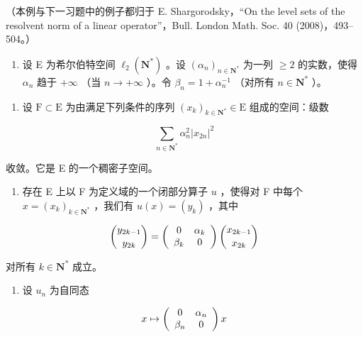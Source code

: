 （本例与下一习题中的例子都归于 E. Shargorodsky，“On the level sets of the resolvent norm of a linear operator”，Bull. London Math. Soc. 40 (2008)，493–504。）

\begin{enumerate}
\def\labelenumi{\arabic{enumi})}
\setcounter{enumi}{18}
\tightlist
\item
  设 E 为希尔伯特空间 \(\ell_2(\mathbf{N}^*)\) 。设 \((\alpha_n)_{n \in \mathbf{N}^*}\) 为一列 \(\geqslant 2\) 的实数，使得 \(\alpha_n\) 趋于 \(+\infty\) （当 \(n \to +\infty\) ）。令 \(\beta_n = 1 + \alpha_n^{-1}\) （对所有 \(n \in \mathbf{N}^*\) ）。
\end{enumerate}

\begin{enumerate}
\def\labelenumi{\alph{enumi})}
\tightlist
\item
  设 \(\mathrm{F}\subset \mathrm{E}\) 为由满足下列条件的序列 \((x_{k})_{k\in \mathbf{N}^{*}}\in \mathrm{E}\) 组成的空间：级数
\end{enumerate}

\[
\sum_ {n \in \mathbf {N} ^ {*}} \alpha_ {n} ^ {2} | x _ {2 n} | ^ {2}
\]

收敛。它是 E 的一个稠密子空间。

\begin{enumerate}
\def\labelenumi{\alph{enumi})}
\setcounter{enumi}{1}
\tightlist
\item
  存在 E 上以 F 为定义域的一个闭部分算子 \(u\) ，使得对 F 中每个 \(x = (x_{k})_{k \in \mathbf{N}^{*}}\) ，我们有 \(u(x) = (y_{k})\) ，其中
\end{enumerate}

\[
\binom{y _ {2 k - 1}}{y _ {2 k}} = \left( \begin{array}{c c} 0 & \alpha_ {k} \\ \beta_ {k} & 0 \end{array} \right) \binom{x _ {2 k - 1}}{x _ {2 k}}
\]

对所有 \(k \in \mathbf{N}^*\) 成立。

\begin{enumerate}
\def\labelenumi{\alph{enumi})}
\setcounter{enumi}{2}
\tightlist
\item
  设 \(u_{n}\) 为自同态
\end{enumerate}

\[
x \mapsto \left( \begin{array}{c c} 0 & \alpha_ {n} \\ \beta_ {n} & 0 \end{array} \right) x
\]

